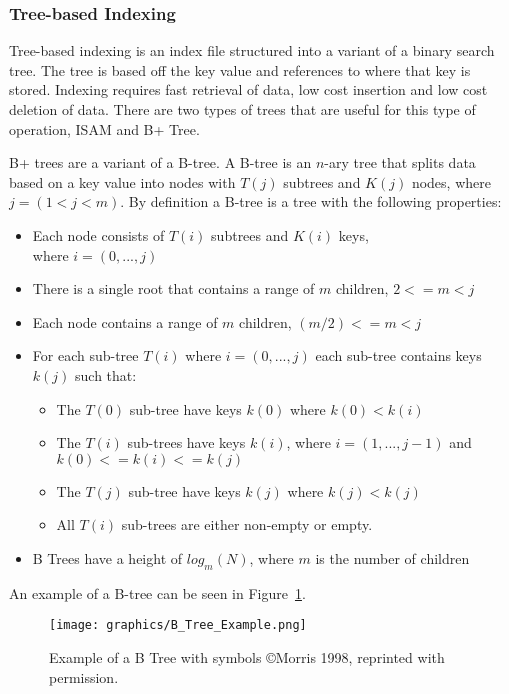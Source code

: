 \documentclass[letterpaper, 11pt]{article}
\begin{document}
\subsubsection{Tree-based Indexing}
Tree-based indexing is an index file structured into a variant of a binary search tree. The tree is based off
the key value and references to where that key is stored. Indexing requires fast retrieval of data, low cost
insertion and low cost deletion of data. There are two types of trees that are useful for this type of operation,
ISAM and B+ Tree.
\par\vspace{\baselineskip}

B+ trees are a variant of a B-tree. A B-tree is an $n$-ary tree that splits data
based on a key value into nodes with $T(j)$ subtrees and $K(j)$ nodes, where $j = (1<j<m)$.
By definition a B-tree is a tree with the following properties:
\begin{itemize}
  \item Each node consists of $T(i)$ subtrees and $K(i)$ keys, \\ where $i = (0,...,j)$
  \item There is a single root that contains a range of $m$ children, $2<= m < j$
  \item Each node contains a range of $m$ children, $(m/2) <= m < j$
  \item For each sub-tree $T(i)$ where $i = (0,...,j)$ each sub-tree contains keys $k(j)$ such that:
  \begin{itemize}
    \item The $T(0)$ sub-tree have keys $k(0)$ where $k(0) < k(i)$
    \item The $T(i)$ sub-trees have keys $k(i)$, where $i = (1, ..., j-1)$ and $k(0) <= k(i) <= k(j)$
    \item The $T(j)$ sub-tree have keys $k(j)$ where $k(j) < k(j)$
    \item All $T(i)$ sub-trees are either non-empty or empty.
  \end{itemize}
  \item B Trees have a height of $log_m(N)$, where $m$ is the number of children
\end{itemize}
An example of a B-tree can be seen in Figure~\ref{fig:b_tree_ex}.

\begin{figure}[H]
  \centering
  \texttt{[image: graphics/B\_Tree\_Example.png]}
  \caption{Example of a B Tree with symbols \copyright Morris 1998, reprinted with permission.\cite{b+tree}}
  \label{fig:b_tree_ex}
\end{figure}
\end{document}

